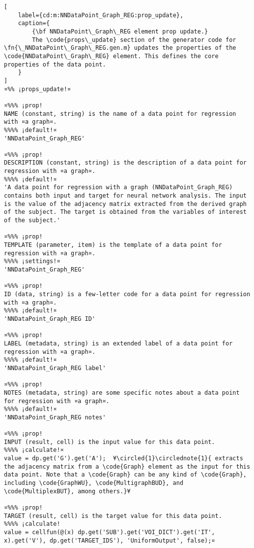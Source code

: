 \documentclass{tufte-handout}
\begin{document}
\begin{lstlisting}[
	label={cd:m:NNDataPoint_Graph_REG:prop_update},
	caption={
		{\bf NNDataPoint\_Graph\_REG element prop update.}
		The \code{props\_update} section of the generator code for \fn{\_NNDataPoint\_Graph\_REG.gen.m} updates the properties of the \code{NNDataPoint\_Graph\_REG} element. This defines the core properties of the data point.
	}
]
¤%% ¡props_update!¤

¤%%% ¡prop!
NAME (constant, string) is the name of a data point for regression with ¤a graph¤.
%%%% ¡default!¤
'NNDataPoint_Graph_REG'

¤%%% ¡prop!
DESCRIPTION (constant, string) is the description of a data point for regression with ¤a graph¤.
%%%% ¡default!¤
'A data point for regression with a graph (NNDataPoint_Graph_REG) contains both input and target for neural network analysis. The input is the value of the adjacency matrix extracted from the derived graph of the subject. The target is obtained from the variables of interest of the subject.'

¤%%% ¡prop!
TEMPLATE (parameter, item) is the template of a data point for regression with ¤a graph¤.
%%%% ¡settings!¤
'NNDataPoint_Graph_REG'

¤%%% ¡prop!
ID (data, string) is a few-letter code for a data point for regression with ¤a graph¤.
%%%% ¡default!¤
'NNDataPoint_Graph_REG ID'

¤%%% ¡prop!
LABEL (metadata, string) is an extended label of a data point for regression with ¤a graph¤.
%%%% ¡default!¤
'NNDataPoint_Graph_REG label'

¤%%% ¡prop!
NOTES (metadata, string) are some specific notes about a data point for regression with ¤a graph¤.
%%%% ¡default!¤
'NNDataPoint_Graph_REG notes'

¤%%% ¡prop!
INPUT (result, cell) is the input value for this data point.
%%%% ¡calculate!¤
value = dp.get('G').get('A');  ¥\circled{1}\circlednote{1}{ extracts the adjacency matrix from a \code{Graph} element as the input for this data point. Note that a \code{Graph} can be any kind of \code{Graph}, including \code{GraphWU}, \code{MultigraphBUD}, and \code{MultiplexBUT}, among others.}¥
    
¤%%% ¡prop!
TARGET (result, cell) is the target value for this data point.
%%%% ¡calculate!
value = cellfun(@(x) dp.get('SUB').get('VOI_DICT').get('IT', x).get('V'), dp.get('TARGET_IDS'), 'UniformOutput', false);¤

\end{lstlisting}
\end{document}
